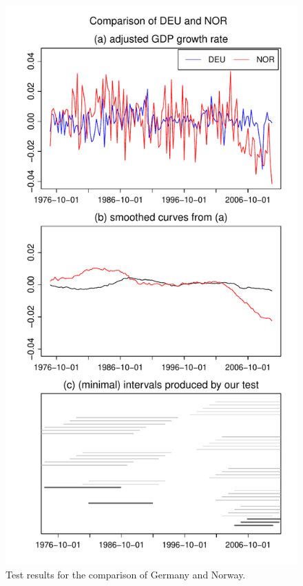 \documentclass[a4paper,12pt]{article}
\begin{document}
\begin{figure}[t!]
\begin{minipage}[t]{0.49\textwidth}
\includegraphics[width=\textwidth]{Plots/gdp/DEU_vs_NOR}
\caption{Test results for the comparison of Germany and Norway.}\label{fig:Germany:Norway}
\end{minipage}
\hspace{0.25cm}

\end{figure}
\end{document}
